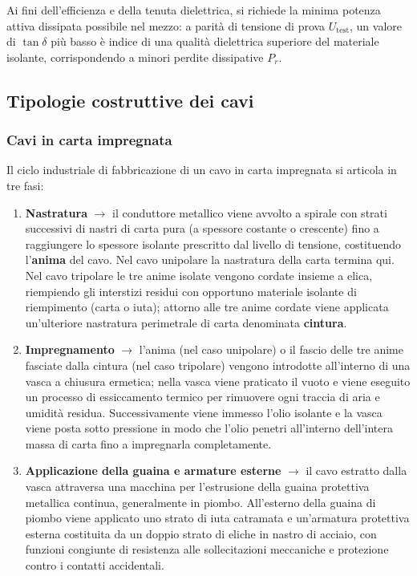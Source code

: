 Ai fini dell'efficienza e della tenuta dielettrica, si richiede la minima potenza attiva dissipata possibile nel mezzo: a parità di tensione di prova $U_{\text{test}}$, un valore di $\tan\delta$ più basso è indice di una qualità dielettrica superiore del materiale isolante, corrispondendo a minori perdite dissipative $P_r$.

\subsection{Tipologie costruttive dei cavi}

\subsubsection{Cavi in carta impregnata}
Il ciclo industriale di fabbricazione di un cavo in carta impregnata si articola in tre fasi:
\begin{enumerate}
    \item \textbf{Nastratura} $\rightarrow$ il conduttore metallico viene avvolto a spirale con strati successivi di nastri di carta pura (a spessore costante o crescente) fino a raggiungere lo spessore isolante prescritto dal livello di tensione, costituendo l'\textbf{anima} del cavo. Nel cavo unipolare la nastratura della carta termina qui. Nel cavo tripolare le tre anime isolate vengono cordate insieme a elica, riempiendo gli interstizi residui con opportuno materiale isolante di riempimento (carta o iuta); attorno alle tre anime cordate viene applicata un'ulteriore nastratura perimetrale di carta denominata \textbf{cintura}.
    \item \textbf{Impregnamento} $\rightarrow$ l'anima (nel caso unipolare) o il fascio delle tre anime fasciate dalla cintura (nel caso tripolare) vengono introdotte all'interno di una vasca a chiusura ermetica; nella vasca viene praticato il vuoto e viene eseguito un processo di essiccamento termico per rimuovere ogni traccia di aria e umidità residua. Successivamente viene immesso l'olio isolante e la vasca viene posta sotto pressione in modo che l'olio penetri all'interno dell'intera massa di carta fino a impregnarla completamente.
    \item \textbf{Applicazione della guaina e armature esterne} $\rightarrow$ il cavo estratto dalla vasca attraversa una macchina per l'estrusione della guaina protettiva metallica continua, generalmente in piombo. All'esterno della guaina di piombo viene applicato uno strato di iuta catramata e un'armatura protettiva esterna costituita da un doppio strato di eliche in nastro di acciaio, con funzioni congiunte di resistenza alle sollecitazioni meccaniche e protezione contro i contatti accidentali.
\end{enumerate}

